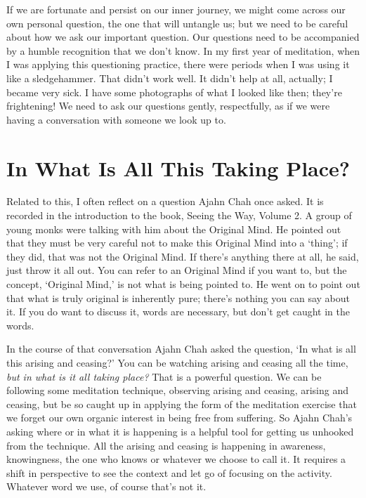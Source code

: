 If we are fortunate and persist on our inner journey, we might come
across our own personal question, the one that will untangle us; but we
need to be careful about how we ask our important question. Our
questions need to be accompanied by a humble recognition that we don’t
know. In my first year of meditation, when I was applying this
questioning practice, there were periods when I was using it like a
sledgehammer. That didn’t work well. It didn’t help at all, actually; I
became very sick. I have some photographs of what I looked like then;
they’re frightening! We need to ask our questions gently, respectfully,
as if we were having a conversation with someone we look up to.

\section{In What Is All This Taking Place?}

Related to this, I often reflect on a question Ajahn Chah once asked.
It is recorded in the introduction to the book, Seeing the Way, Volume
2.\cite{seeing-vol2} A group of young monks were talking with him about the Original
Mind. He pointed out that they must be very careful not to make this
Original Mind into a ‘thing’; if they did, that was not the Original
Mind. If there’s anything there at all, he said, just throw it all out.
You can refer to an Original Mind if you want to, but the concept,
‘Original Mind,’ is not what is being pointed to. He went on to point
out that what is truly original is inherently pure; there’s nothing you
can say about it. If you do want to discuss it, words are necessary, but
don’t get caught in the words.

In the course of that conversation Ajahn Chah asked the question, ‘In
what is all this arising and ceasing?’ You can be watching arising and
ceasing all the time, \emph{but in what is it all taking place?} That is a
powerful question. We can be following some meditation technique,
observing arising and ceasing, arising and ceasing, but be so caught up
in applying the form of the meditation exercise that we forget our own
organic interest in being free from suffering. So Ajahn Chah’s asking
where or in what it is happening is a helpful tool for getting us
unhooked from the technique. All the arising and ceasing is happening in
awareness, knowingness, the one who knows or whatever we choose to call
it. It requires a shift in perspective to see the context and let go of
focusing on the activity. Whatever word we use, of course that’s not it.

